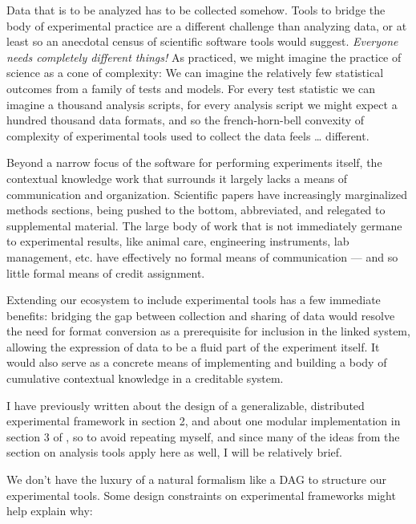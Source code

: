 \documentclass[10pt]{article}
\begin{document}
\begin{multicols}{2}
 Data that is to be analyzed has to be collected somehow.
Tools to bridge the body of experimental practice are a different
challenge than analyzing data, or at least so an anecdotal census of
scientific software tools would suggest. \emph{Everyone needs completely
different things!} As practiced, we might imagine the practice of
science as a cone of complexity: We can imagine the relatively few
statistical outcomes from a family of tests and models. For every test
statistic we can imagine a thousand analysis scripts, for every analysis
script we might expect a hundred thousand data formats, and so the
french-horn-bell convexity of complexity of experimental tools used to
collect the data feels \ldots{} different.

Beyond a narrow focus of the software for performing experiments itself,
the contextual knowledge work that surrounds it largely lacks a means of
communication and organization. Scientific papers have increasingly
marginalized methods sections, being pushed to the bottom, abbreviated,
and relegated to supplemental material. The large body of work that is
not immediately germane to experimental results, like animal care,
engineering instruments, lab management, etc. have effectively no formal
means of communication --- and so little formal means of credit
assignment.

Extending our ecosystem to include experimental tools has a few
immediate benefits: bridging the gap between collection and sharing of
data would resolve the need for format conversion as a prerequisite for
inclusion in the linked system, allowing the expression of data to be a
fluid part of the experiment itself. It would also serve as a concrete
means of implementing and building a body of cumulative contextual
knowledge in a creditable system.

I have previously written about the design of a generalizable,
distributed experimental framework in section 2, and about one modular
implementation in section 3 of \cite{saundersAutopilotAutomatingBehavioral2019} , so to avoid repeating
myself, and since many of the ideas from the section on analysis tools
apply here as well, I will be relatively brief.

We don't have the luxury of a natural formalism like a DAG to structure
our experimental tools. Some design constraints on experimental
frameworks might help explain why:

\begin{itemize}


\end{itemize}
\end{multicols}
\end{document}
